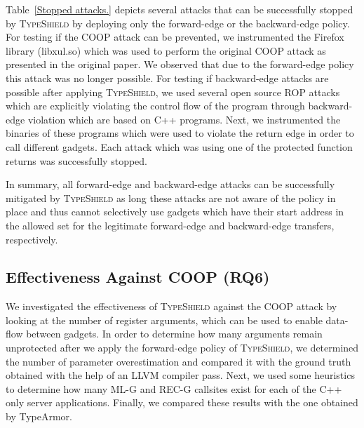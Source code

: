 Table~\ref{Stopped attacks.} depicts several attacks that can be successfully stopped by \textsc{TypeShield}
by deploying only the forward-edge or the backward-edge policy.
For testing if the COOP attack can be prevented, we instrumented the Firefox library (libxul.so) which was used to perform the original COOP
attack as presented in the original paper. We observed that due to the forward-edge policy this attack was no longer possible.
For testing if backward-edge attacks are possible after applying \textsc{TypeShield}, we used several 
open source ROP attacks which are explicitly violating the control flow of the program through
backward-edge violation which are based on C++ programs.
Next, we instrumented the binaries of these programs which were used to violate the return edge in order to call different gadgets.
Each attack which was using one of the protected function returns was successfully stopped. 
 
In summary, all forward-edge and backward-edge attacks can be successfully mitigated by \textsc{TypeShield} as long these attacks are not 
aware of the policy in place and thus cannot selectively use gadgets which have their start address in the 
allowed set for the legitimate forward-edge and backward-edge transfers, respectively.

\subsection{Effectiveness Against COOP (RQ6)}
\label{RQ8: Effectiveness Against COOP}
We investigated the effectiveness of \textsc{TypeShield} against the COOP
attack by looking at the number of register arguments, which can be used to enable 
data-flow between gadgets. In order to determine how many arguments 
remain unprotected after we apply the forward-edge policy of \textsc{TypeShield},
we determined the number of parameter overestimation and compared it with the ground truth
obtained with the help of an LLVM compiler pass. Next, we used some heuristics to determine 
how many ML-G and REC-G callsites exist for each of the C++ only server applications.
Finally, we compared these results with the one obtained by TypeArmor.

